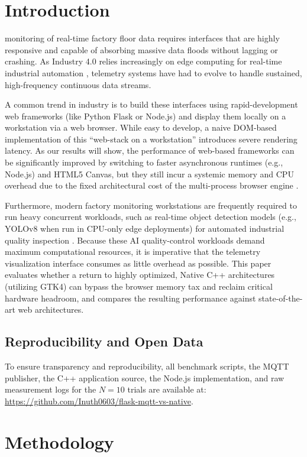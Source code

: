 \documentclass[lettersize,journal]{IEEEtran}
\begin{document}
\section{Introduction}
\label{sec:introduction}
 monitoring of real-time factory floor data requires interfaces that are highly responsive and capable of absorbing massive data floods without lagging or crashing. As Industry 4.0 relies increasingly on edge computing for real-time industrial automation \cite{b1, b4}, telemetry systems have had to evolve to handle sustained, high-frequency continuous data streams.

A common trend in industry is to build these interfaces using rapid-development web frameworks (like Python Flask or Node.js) and display them locally on a workstation via a web browser. While easy to develop, a naive DOM-based implementation of this ``web-stack on a workstation'' introduces severe rendering latency. As our results will show, the performance of web-based frameworks can be significantly improved by switching to faster asynchronous runtimes (e.g., Node.js) and HTML5 Canvas, but they still incur a systemic memory and CPU overhead due to the fixed architectural cost of the multi-process browser engine \cite{b5}.

Furthermore, modern factory monitoring workstations are frequently required to run heavy concurrent workloads, such as real-time object detection models (e.g., YOLOv8 \cite{b2} when run in CPU-only edge deployments) for automated industrial quality inspection \cite{b3}. Because these AI quality-control workloads demand maximum computational resources, it is imperative that the telemetry visualization interface consumes as little overhead as possible. This paper evaluates whether a return to highly optimized, Native C++ architectures (utilizing GTK4) can bypass the browser memory tax and reclaim critical hardware headroom, and compares the resulting performance against state-of-the-art web architectures.

\subsection{Reproducibility and Open Data}
To ensure transparency and reproducibility, all benchmark scripts, the MQTT publisher, the C++ application source, the Node.js implementation, and raw measurement logs for the $N=10$ trials are available at: \url{https://github.com/Inuth0603/flask-mqtt-vs-native}.

\section{Methodology}
\end{document}
